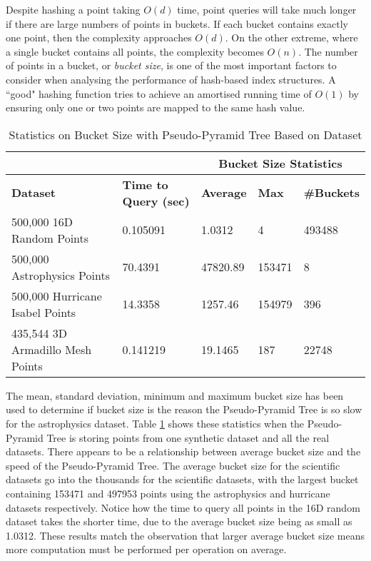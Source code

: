 Despite hashing a point taking $O(d)$ time, point queries will take much longer if there are large numbers of points in buckets. If each bucket contains exactly one point, then the complexity approaches $O(d)$. On the other extreme, where a single bucket contains all points, the complexity becomes $O(n)$. The number of points in a bucket, or \textit{bucket size}, is one of the most important factors to consider when analysing the performance of hash-based index structures. A ``good" hashing function tries to achieve an amortised running time of $O(1)$ by ensuring only one or two points are mapped to the same hash value.

\begin{table}
	\centering
	\begin{tabular}{|l|l|l|l|l|}
		\hline
		& & \multicolumn{3}{c|}{\textbf{Bucket Size Statistics}} \\
		\hline
		\textbf{Dataset} & \textbf{Time to Query (sec)} & \textbf{Average} & \textbf{Max} & \textbf{\#Buckets} \\
		\hline
		500,000 16D Random Points & 0.105091 & 1.0312 & 4 & 493488 \\
		500,000 Astrophysics Points & 70.4391 & 47820.89 & 153471 & 8  \\
		500,000 Hurricane Isabel Points & 14.3358 & 1257.46 & 154979 & 396 \\
		435,544 3D Armadillo Mesh Points & 0.141219 & 19.1465 & 187 & 22748 \\
		\hline
	\end{tabular}
	\caption{Statistics on Bucket Size with Pseudo-Pyramid Tree Based on Dataset}
	\label{tab:perf1-bucket-stats}
\end{table}

The mean, standard deviation, minimum and maximum bucket size has been used to determine if bucket size is the reason the Pseudo-Pyramid Tree is so slow for the astrophysics dataset. Table \ref{tab:perf1-bucket-stats} shows these statistics when the Pseudo-Pyramid Tree is storing points from one synthetic dataset and all the real datasets. There appears to be a relationship between average bucket size and the speed of the Pseudo-Pyramid Tree. The average bucket size for the scientific datasets go into the thousands for the scientific datasets, with the largest bucket containing 153471 and 497953 points using the astrophysics and hurricane datasets respectively. Notice how the time to query all points in the 16D random dataset takes the shorter time, due to the average bucket size being as small as 1.0312. These results match the observation that larger average bucket size means more computation must be performed per operation on average.

